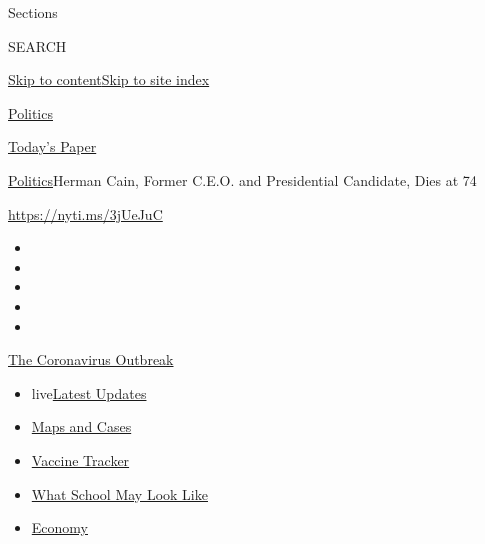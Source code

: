 Sections

SEARCH

\protect\hyperlink{site-content}{Skip to
content}\protect\hyperlink{site-index}{Skip to site index}

\href{https://www.nytimes3xbfgragh.onion/section/politics}{Politics}

\href{https://myaccount.nytimes3xbfgragh.onion/auth/login?response_type=cookie\&client_id=vi}{}

\href{https://www.nytimes3xbfgragh.onion/section/todayspaper}{Today's
Paper}

\href{/section/politics}{Politics}\textbar{}Herman Cain, Former C.E.O.
and Presidential Candidate, Dies at 74

\url{https://nyti.ms/3jUeJuC}

\begin{itemize}
\item
\item
\item
\item
\item
\end{itemize}

\href{https://www.nytimes3xbfgragh.onion/news-event/coronavirus?action=click\&pgtype=Article\&state=default\&region=TOP_BANNER\&context=storylines_menu}{The
Coronavirus Outbreak}

\begin{itemize}
\tightlist
\item
  live\href{https://www.nytimes3xbfgragh.onion/2020/08/02/world/coronavirus-updates.html?action=click\&pgtype=Article\&state=default\&region=TOP_BANNER\&context=storylines_menu}{Latest
  Updates}
\item
  \href{https://www.nytimes3xbfgragh.onion/interactive/2020/us/coronavirus-us-cases.html?action=click\&pgtype=Article\&state=default\&region=TOP_BANNER\&context=storylines_menu}{Maps
  and Cases}
\item
  \href{https://www.nytimes3xbfgragh.onion/interactive/2020/science/coronavirus-vaccine-tracker.html?action=click\&pgtype=Article\&state=default\&region=TOP_BANNER\&context=storylines_menu}{Vaccine
  Tracker}
\item
  \href{https://www.nytimes3xbfgragh.onion/interactive/2020/07/29/us/schools-reopening-coronavirus.html?action=click\&pgtype=Article\&state=default\&region=TOP_BANNER\&context=storylines_menu}{What
  School May Look Like}
\item
  \href{https://www.nytimes3xbfgragh.onion/live/2020/07/31/business/stock-market-today-coronavirus?action=click\&pgtype=Article\&state=default\&region=TOP_BANNER\&context=storylines_menu}{Economy}
\end{itemize}

